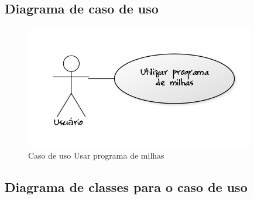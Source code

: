 \subsection{Diagrama de caso de uso}

\begin{figure}[!htb]
     \centering
     \includegraphics[scale=0.6]{diagramas/caso-de-uso/imagens/utilizarProgramaMilhas.png}
     \caption{Caso de uso Usar programa de milhas}
\end{figure}

\subsection{Diagrama de classes para o caso de uso}
